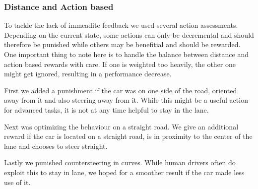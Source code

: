 \subsubsection{Distance and Action based}
To tackle the lack of immeadite feedback we used several action assessments. Depending on the current state, some actions can only be decremental and should therefore be punished while others may be benefitial and should be rewarded. One important thing to note here is to handle the balance between distance and action based rewards with care. If one is weighted too heavily, the other one might get ignored, resulting in a performance decrease.

First we added a punishment if the car was on one side of the road, oriented away from it and also steering away from it. While this might be a useful action for advanced tasks, it is not at any time helpful to stay in the lane.

Next was optimizing the behaviour on a straight road. We give an additional reward if the car is located on a straight road, is in proximity to the center of the lane and chooses to steer straight.

Lastly we punished countersteering in curves. While human drivers often do exploit this to stay in lane, we hoped for a smoother result if the car made less use of it.